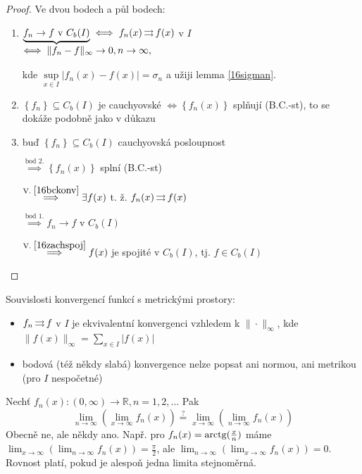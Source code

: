 \begin{proof}
    Ve dvou bodech a půl bodech:
  \begin{enumerate}[1.]
      \item $\underbrace{f_n \to f \text{ v } C_b(I)}_{\mathclap{\hspace{6em}\textstyle \iff \|f_n-f\|_\infty\to 0, n \to \infty,}}\iff f_n(x) \toto f(x)$ v $I$

    kde $\sup\limits_{x \in I} |f_n(x)-f(x)|=\sigma_n$ a užiji lemma \ref{16sigman}.
\item $\left\{f_n\right\}\subseteq C_b(I)$ je cauchyovské $\iff \left\{f_n(x)\right\}$ splňují (B.C.-st), to se dokáže podobně jako v důkazu 
\item[\textsc{celkem}:] buď $\left\{f_n\right\}\subseteq C_b(I)$ cauchyovská posloupnost

    $\stackrel{\text{bod }2.}{\implies} \left\{f_n(x)\right\}$ splní (B.C.-st)

          $\stackrel{\text{V. }\ref{16bckonv}}{\implies} \exists f(x)$ t. ž. $f_n(x)\operatorname{\rightrightarrows} f(x)$

          $\stackrel{\text{bod }1.}{\implies}f_n\to f$ v $C_b(I)$

          $\stackrel{\text{V. }\ref{16zachspoj}}{\implies}f(x)$ je spojité v $C_b(I)$, tj. $f\in C_b(I)$
  \end{enumerate}
\end{proof}

\begin{poznamka}
    Souvislosti konvergencí funkcí s metrickými prostory:
  \begin{itemize}
    \item $f_n \operatorname{\rightrightarrows} f$ v $I$ je ekvivalentní konvergenci vzhledem k $\|\cdot\|_\infty$, kde $\|f(x)\|_\infty = \sum\limits_{x \in I} |f(x)|$
    \item bodová (též někdy slabá) konvergence nelze popsat ani normou, ani metrikou (pro $I$ nespočetné)
  \end{itemize}
\end{poznamka}

\begin{poznamka}
  Nechť $f_n(x) \colon (0, \infty) \to \mathbb R, n=1,2,\dots$ Pak
  $$\lim_{n\to \infty}\left(\lim_{x\to\infty}f_n(x)\right)\stackrel{?}{=}\lim_{x\to \infty}\left(\lim_{n\to\infty}f_n(x)\right)$$
  Obecně ne, ale někdy ano. Např. pro $f_n(x)=\operatorname{arctg}(\frac{x}{n})$ máme $\lim_{x\to \infty}\left(\lim_{n\to\infty}f_n(x)\right) = \frac{\pi}{2}$, ale $\lim_{n\to \infty}\left(\lim_{x\to\infty}f_n(x)\right) = 0$. Rovnost platí, pokud je alespoň jedna limita stejnoměrná.
\end{poznamka}


